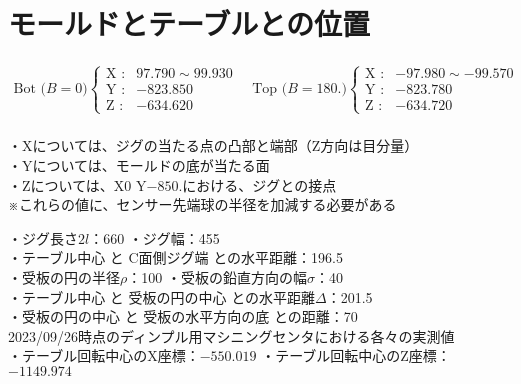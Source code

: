 \chapter{モールドとテーブルとの位置}
\begin{tcolorbox}[title={2023/07/28時点の三菱マシニングセンタ実測値}, fonttitle=\gtfamily\bfseries]
\begin{align*}
  \text{Bot ($B=0$)}
  \left\{
  \begin{array}{rl}
    \text{X :} & 97.790 \sim 99.930\\
    \text{Y :} & -823.850\\
    \text{Z :} & -634.620
  \end{array}
  \right.\quad
  \text{Top ($B=180.$)}
  \left\{
  \begin{array}{rl}
    \text{X :} & -97.980 \sim -99.570\\
    \text{Y :} & -823.780\\
    \text{Z :} & -634.720
  \end{array}
  \right.
\end{align*}\\
・Xについては、ジグの当たる点の凸部と端部（Z方向は目分量）\\
・Yについては、モールドの底が当たる面\\
・Zについては、X0 Y$-850.$における、ジグとの接点\\
※これらの値に、センサー先端球の半径を加減する必要がある
\end{tcolorbox}
\begin{tcolorbox}[title={ディンプル用マシニングセンタにおける各々の値（図面上の値）}, fonttitle=\gtfamily\bfseries]
・ジグ長さ$2l$：660 \quad ・ジグ幅：455\\
・テーブル中心 と C面側ジグ端 との水平距離：196.5\\
・受板の円の半径$\rho$：100 \quad ・受板の鉛直方向の幅$\sigma$：40\\
・テーブル中心 と 受板の円の中心 との水平距離$\varDelta$：201.5\\
・受板の円の中心 と 受板の水平方向の底 との距離：70\\[12pt]
2023/09/26時点のディンプル用マシニングセンタにおける各々の実測値\\
・テーブル回転中心のX座標：$-550.019$ \quad ・テーブル回転中心のZ座標：$-1149.974$
\end{tcolorbox}




